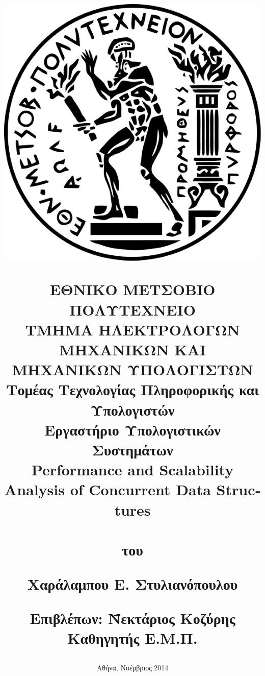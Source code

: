 \documentclass[12pt, twoside, a4paper]{report}
\begin{document}

\title{
\vspace{-6ex}
\begin{center}
\includegraphics[scale=0.14]{pyrforos.png}  %
\end{center}
\Large{Ε}\large{ΘΝΙΚΟ}
\Large{Μ}\large{ΕΤΣΟΒΙΟ}
\Large{Π}\large{ΟΛΥΤΕΧΝΕΙΟ} \\
\normalsize{Τ}\small{ΜΗΜΑ}
\normalsize{Η}\small{ΛΕΚΤΡΟΛΟΓΩΝ}
\normalsize{Μ}\small{ΗΧΑΝΙΚΩΝ}
\normalsize{Κ}\small{ΑΙ}
\normalsize{Μ}\small{ΗΧΑΝΙΚΩΝ}
\normalsize{Υ}\small{ΠΟΛΟΓΙΣΤΩΝ} \\
\vspace{2ex}
Τομέας Τεχνολογίας Πληροφορικής και Υπολογιστών \\
Εργαστήριο Υπολογιστικών Συστημάτων  \\
\vspace{8ex}
\large \textbf{\textlatin{Performance and Scalability Analysis of Concurrent Data Structures}} \\
\vspace{10ex}
\large
{} \\
\vspace{2ex}
\normalsize
του \\
\vspace{2ex}
\hspace{-0.2cm}
\parbox[c]{\textwidth} { \center\textbf{
{Χαράλαμπου Ε. Στυλιανόπουλου} }}
\vspace{10ex}
\flushleft
\begin{tabbing}
	\textbf{Επιβλέπων}: \= Νεκτάριος Κοζύρης \\
			    \> Καθηγητής Ε.Μ.Π.\\
\end{tabbing}
}
\date{
\normalsize
Αθήνα, Νοέμβριος 2014}
\end{document}
